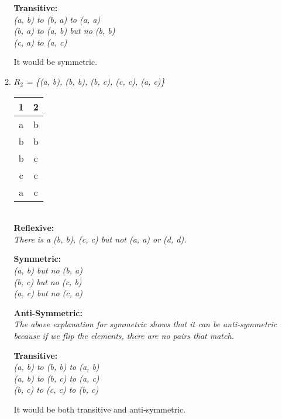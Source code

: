 \documentclass[11pt]{article}
\begin{document}
\begin{enumerate}
\begin{enumerate}[label=(\alph*)]
\textbf {
Transitive: 
} \\
\textit {
(a, b) to (b, a) to (a, a) \\
(b, a) to (a, b) but no (b, b) \\
(c, a) to (a, c) \\
}

It would be symmetric. \\

\item %
\textit {
$R_{2}$ = \{(a, b), (b, b), (b, c), (c, c), (a, c)\} \\
}
\begin {tabular} {c|c}
    \textbf {1} & \textbf {2} \\
    \hline
    a & b \\
    b & b \\
    b & c \\
    c & c \\
    a & c \\
\end {tabular} \\
\newline
\textbf {
Reflexive: 
} \\
\textit {
There is a (b, b), (c, c) but not (a, a) or (d, d).
}

\textbf {
Symmetric: 
} \\
\textit {
(a, b) but no (b, a) \\
(b, c) but no (c, b) \\
(a, c) but no (c, a) \\
}

\textbf {
Anti-Symmetric: 
} \\
\textit {
The above explanation for symmetric shows that it can be anti-symmetric because if we flip the elements, there are no pairs that match. \\
}

\textbf {
Transitive: 
} \\
\textit {
(a, b) to (b, b) to (a, b) \\
(a, b) to (b, c) to (a, c) \\
(b, c) to (c, c) to (b, c) \\
}

It would be both transitive and anti-symmetric. \\


\end{enumerate}
\end{enumerate}
\end{document}
